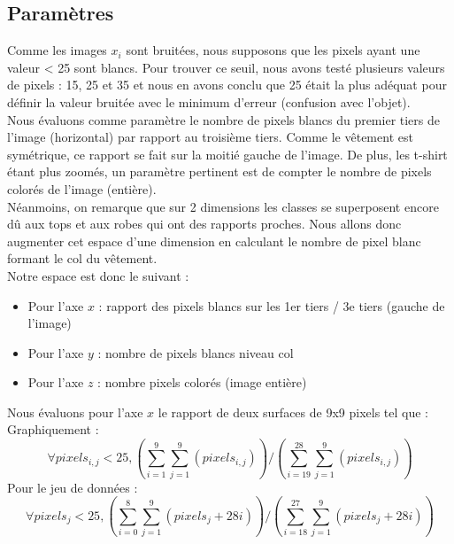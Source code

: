 \documentclass[a4paper,10pt]{article}
\begin{document}
	\subsection{Paramètres}
		Comme les images $x_i$ sont bruitées, nous supposons que les pixels ayant une valeur < 25 sont blancs.
		Pour trouver ce seuil, nous avons testé plusieurs valeurs de pixels : 15, 25 et 35 et nous en avons conclu que 25 était la plus adéquat pour définir la valeur bruitée avec le minimum d'erreur (confusion avec l'objet).\\
		Nous évaluons comme paramètre le nombre de pixels blancs du premier tiers de l'image (horizontal) par rapport au troisième tiers. Comme le vêtement est symétrique, ce rapport se fait sur la moitié gauche de l'image. De plus, les t-shirt étant plus zoomés, un paramètre pertinent est de compter le nombre de pixels colorés de l'image (entière).\\
		Néanmoins, on remarque que sur 2 dimensions les classes se superposent encore dû aux tops et aux robes qui ont des rapports proches. Nous allons donc augmenter cet espace d'une dimension en calculant le nombre de pixel blanc formant le col du vêtement. \\
		Notre espace est donc le suivant :
		\begin{itemize}
			\item Pour l'axe $x$ : rapport des pixels blancs sur les 1er tiers / 3e tiers (gauche de l'image)
			\item Pour l'axe $y$ : nombre de pixels blancs niveau col
			\item Pour l'axe $z$ : nombre pixels colorés (image entière)
		\end{itemize}
		Nous évaluons pour l'axe $x$ le rapport de deux surfaces de 9x9 pixels tel que : \\
		Graphiquement :
		$$ \forall pixels_{i,j} < 25,  (\sum_{i=1} ^9 \sum_{j=1} ^9  (pixels_{i,j})) / (\sum_{i=19} ^{28} \sum_{j=1}^9  (pixels_{i,j}) ) $$
		Pour le jeu de données :
		$$ \forall pixels_j < 25, (\sum_{i=0} ^8 \sum_{j=1} ^9  (pixels_j +28i) ) / (\sum_{i=18} ^{27} \sum_{j=1} ^9  (pixels_j+28i) ) $$
\end{document}
